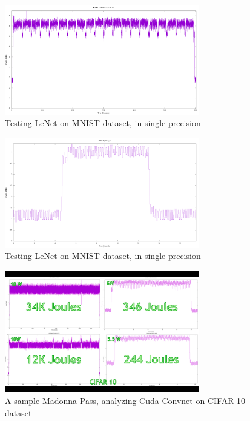 \documentclass[letterpaper, 10 pt, conference]{ieeeconf}
\begin{document}
          \begin{figure}[h]
              \centering
              \includegraphics[width=85mm,scale=1]{lenet_train_single.png}
              \caption{Testing LeNet on MNIST dataset, in single precision}
              \label{lenet_train_single}
          \end{figure}
          
          \begin{figure}[h]
              \centering
              \includegraphics[width=85mm,scale=1]{lenet_test_single.png}
              \caption{Testing LeNet on MNIST dataset, in single precision}
              \label{lenet_test_single}
          \end{figure}
          
          \begin{figure}[h]
              \centering
              \includegraphics[width=85mm,scale=1]{cifar10.png}
              \caption{A sample Madonna Pass, analyzing Cuda-Convnet on CIFAR-10 dataset}
              \label{cifar}
          \end{figure}
          
\end{document}
